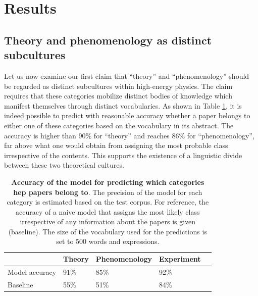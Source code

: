\documentclass[smallextended]{svjour3}
\begin{document}
\section{Results}
\label{section:application}

\subsection{Theory and phenomenology as distinct subcultures}\label{section:application_subcultures}

Let us now examine our first claim that ``theory'' and ``phenomenology''  should be regarded as distinct subcultures within high-energy physics. The claim requires that these categories mobilize distinct bodies of knowledge which manifest themselves through distinct vocabularies. As shown in Table \ref{table:categories_bow_prediction}, it is indeed possible to predict with reasonable accuracy whether a paper belongs to either one of these categories based on the vocabulary in its abstract. The accuracy is higher than 90\% for ``theory'' and reaches 86\% for ``phenomenology'', far above what one would obtain from assigning the most probable class irrespective of the contents. This supports the existence of a linguistic divide between these two theoretical cultures.

\begin{table}[h]
\centering
\begin{tabular}{@{}lllll@{}}
\toprule
               & Theory & Phenomenology & Experiment &  \\ \midrule
Model accuracy & 91\%   & 85\%          & 92\%       &  \\
Baseline       & 55\%   & 51\%          & 84\%       &  \\ \bottomrule
\end{tabular}
\caption{\textbf{Accuracy of the model for predicting which categories \gls{hep} papers belong to}. The precision of the model for each category is estimated based on the test corpus. For reference, the accuracy of a naive model that assigns the most likely class irrespective of any information about the papers is given (baseline). The size of the vocabulary used for the predictions is set to 500 words and expressions. }
    \label{table:categories_bow_prediction}
\end{table}
\end{document}

